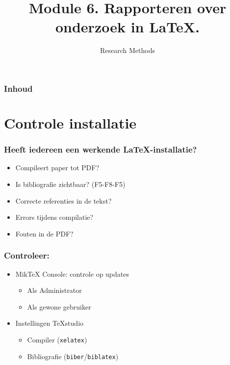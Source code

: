 \documentclass[aspectratio=169]{beamer}
\title{Module 6. Rapporteren over onderzoek in \LaTeX{}.}
\subtitle{Research Methods}
\author{\lecturers}   %
\date{\academicyear}
\begin{document}
\begin{frame}
  \maketitle
\end{frame}

\begin{frame}
  \frametitle{Inhoud}

  \tableofcontents
\end{frame}

\section{Controle installatie}

\begin{frame}
  \frametitle{Heeft iedereen een werkende {\LaTeX}-installatie?}

  \begin{itemize}
    \item Compileert paper tot PDF?
    \item Is bibliografie zichtbaar? (F5-F8-F5)
    \item Correcte referenties in de tekst?
    \item Errors tijdens compilatie?
    \item Fouten in de PDF?
  \end{itemize}

\end{frame}

\begin{frame}
  \frametitle{Controleer:}

  \begin{itemize}
    \item Mik{\TeX} Console: controle op updates
      \begin{itemize}
        \item Als Administrator
        \item Als gewone gebruiker
      \end{itemize}
    \item Instellingen TeXstudio
      \begin{itemize}
        \item Compiler (\texttt{xelatex})
        \item Bibliografie (\texttt{biber}/\texttt{biblatex})
      \end{itemize}
  \end{itemize}

\end{frame}
\end{document}
